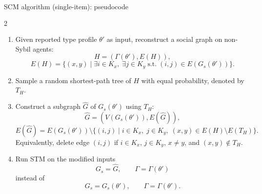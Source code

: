 \documentclass[10pt,aspectratio=169]{beamer}
\begin{document}
\begin{frame}{SCM algorithm (single-item): pseudocode}
\begin{multicols}{2}
  \scriptsize
\begin{enumerate}
  \item Given reported type profile $\theta'$ as input, reconstruct a social graph on non-Sybil agents:
  \[
    H=(\Gamma(\theta'),E(H)),
  \]
  \[
    E(H)=\{(x,y)\mid \exists i\in K_x,\; \exists j\in K_y\;\text{s.t.}\; (i,j)\in E(G_s(\theta'))\}.
  \]
  \item Sample a random shortest-path tree of $H$ with equal probability, denoted by $T_H$.
  \item Construct a subgraph $\hat G$ of $G_s(\theta')$ using $T_H$:
  \[
    \hat G=(V(G_s(\theta')),E(\hat G)),
  \]
  \[
    E(\hat G)=E(G_s(\theta'))\setminus\{(i,j)\mid i\in K_x,\; j\in K_y,\; (x,y)\in E(H)\setminus E(T_H)\}.
  \]
  Equivalently, delete edge $(i,j)$ if $i\in K_x$, $j\in K_y$, $x\ne y$, and $(x,y)\notin T_H$.
  \item Run STM on the modified inputs
  \[
    G_s=\hat G,\qquad \Gamma=\Gamma(\theta')
  \]
  instead of
  \[
    G_s=G_s(\theta'),\qquad \Gamma=\Gamma(\theta').
  \]
\end{enumerate}
\end{multicols}
\end{frame}
\end{document}
